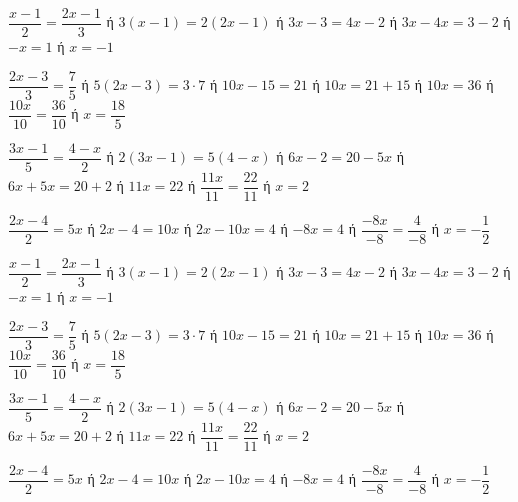 \begin{alist}
\item $ \dfrac{x-1}{2}=\dfrac{2x-1}{3} $ ή $ 3(x-1)=2(2x-1) $ ή $ 3x-3=4x-2 $ ή $ 3x-4x=3-2 $ ή $ -x=1 $ ή $ x=-1 $
\item $ \dfrac{2x-3}{3}=\dfrac{7}{5} $ ή $ 5(2x-3)=3\cdot 7 $ ή $ 10x-15=21 $ ή $ 10x=21+15 $ ή $ 10x=36 $ ή $ \dfrac{10x}{10}=\dfrac{36}{10} $ ή $ x=\dfrac{18}{5} $
\item $ \dfrac{3x-1}{5}=\dfrac{4-x}{2} $ ή $ 2(3x-1)=5(4-x) $ ή $ 6x-2=20-5x $ ή $ 6x+5x=20+2 $ ή $ 11x=22 $ ή $ \dfrac{11x}{11}=\dfrac{22}{11} $ ή $ x=2 $
\item $ \dfrac{2x-4}{2}=5x $ ή $ 2x-4=10x $ ή $ 2x-10x=4 $ ή $ -8x=4 $ ή $ \dfrac{-8x}{-8}=\dfrac{4}{-8} $ ή $ x=-\dfrac{1}{2} $
\end{alist}
\begin{alist}
\item $ \dfrac{x-1}{2}=\dfrac{2x-1}{3} $ ή $ 3(x-1)=2(2x-1) $ ή $ 3x-3=4x-2 $ ή $ 3x-4x=3-2 $ ή $ -x=1 $ ή $ x=-1 $
\item $ \dfrac{2x-3}{3}=\dfrac{7}{5} $ ή $ 5(2x-3)=3\cdot 7 $ ή $ 10x-15=21 $ ή $ 10x=21+15 $ ή $ 10x=36 $ ή $ \dfrac{10x}{10}=\dfrac{36}{10} $ ή $ x=\dfrac{18}{5} $
\item $ \dfrac{3x-1}{5}=\dfrac{4-x}{2} $ ή $ 2(3x-1)=5(4-x) $ ή $ 6x-2=20-5x $ ή $ 6x+5x=20+2 $ ή $ 11x=22 $ ή $ \dfrac{11x}{11}=\dfrac{22}{11} $ ή $ x=2 $
\item $ \dfrac{2x-4}{2}=5x $ ή $ 2x-4=10x $ ή $ 2x-10x=4 $ ή $ -8x=4 $ ή $ \dfrac{-8x}{-8}=\dfrac{4}{-8} $ ή $ x=-\dfrac{1}{2} $
\end{alist}
